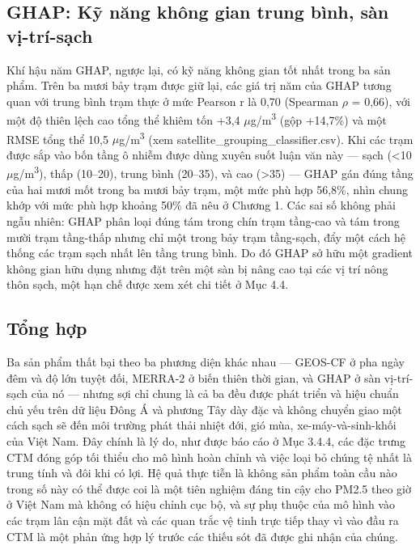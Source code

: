 \subsection{GHAP: Kỹ năng không gian trung bình, sàn vị-trí-sạch}
Khí hậu năm GHAP, ngược lại, có kỹ năng không gian tốt nhất trong ba sản phẩm. Trên ba mươi bảy trạm được giữ lại, các giá trị năm của GHAP tương quan với trung bình trạm thực ở mức Pearson r là 0,70 (Spearman $\rho$ = 0,66), với một độ thiên lệch cao tổng thể khiêm tốn +3,4 $\mu$g/m\textsuperscript{3} (gộp +14,7\%) và một RMSE tổng thể 10,5 $\mu$g/m\textsuperscript{3} (xem satellite\_grouping\_classifier.csv). Khi các trạm được sắp vào bốn tầng ô nhiễm được dùng xuyên suốt luận văn này --- sạch (<10 $\mu$g/m\textsuperscript{3}), thấp (10--20), trung bình (20--35), và cao (>35) --- GHAP gán đúng tầng của hai mươi mốt trong ba mươi bảy trạm, một mức phù hợp 56,8\%, nhìn chung khớp với mức phù hợp khoảng 50\% đã nêu ở Chương 1. Các sai số không phải ngẫu nhiên: GHAP phân loại đúng tám trong chín trạm tầng-cao và tám trong mười trạm tầng-thấp nhưng chỉ một trong bảy trạm tầng-sạch, đẩy một cách hệ thống các trạm sạch nhất lên tầng trung bình. Do đó GHAP sở hữu một gradient không gian hữu dụng nhưng đặt trên một sàn bị nâng cao tại các vị trí nông thôn sạch, một hạn chế được xem xét chi tiết ở Mục 4.4.
\subsection{Tổng hợp}
Ba sản phẩm thất bại theo ba phương diện khác nhau --- GEOS-CF ở pha ngày đêm và độ lớn tuyệt đối, MERRA-2 ở biến thiên thời gian, và GHAP ở sàn vị-trí-sạch của nó --- nhưng sợi chỉ chung là cả ba đều được phát triển và hiệu chuẩn chủ yếu trên dữ liệu Đông Á và phương Tây dày đặc và không chuyển giao một cách sạch sẽ đến môi trường phát thải nhiệt đới, gió mùa, xe-máy-và-sinh-khối của Việt Nam. Đây chính là lý do, như được báo cáo ở Mục 3.4.4, các đặc trưng CTM đóng góp tối thiểu cho mô hình hoàn chỉnh và việc loại bỏ chúng tệ nhất là trung tính và đôi khi có lợi. Hệ quả thực tiễn là không sản phẩm toàn cầu nào trong số này có thể được coi là một tiên nghiệm đáng tin cậy cho PM2.5 theo giờ ở Việt Nam mà không có hiệu chỉnh cục bộ, và sự phụ thuộc của mô hình vào các trạm lân cận mặt đất và các quan trắc vệ tinh trực tiếp thay vì vào đầu ra CTM là một phản ứng hợp lý trước các thiếu sót đã được ghi nhận của chúng.
